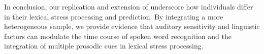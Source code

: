 In conclusion, our replication and extension of \cite{Sulpizio_McQueen_2012} underscore how individuals differ in their lexical stress processing and prediction. By integrating a more heterogeneous sample, we provide evidence that auditory sensitivity and linguistic factors can modulate the time course of spoken word recognition and the integration of multiple prosodic cues in lexical stress processing. 